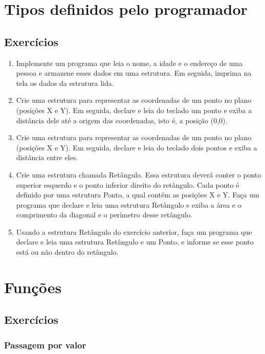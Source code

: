 \documentclass[a4paper,12pt]{article}
\begin{document}
\pagebreak
\section{Tipos definidos pelo programador}

\subsection{Exercícios}

\begin{enumerate}
  \item Implemente um programa que leia o nome, a idade e o endereço de uma pessoa e armazene esses dados em uma estrutura. Em seguida, imprima na tela os dados da estrutura lida.
  \item Crie uma estrutura para representar as coordenadas de um ponto no plano (posições X e Y). Em seguida, declare e leia do teclado um ponto e exiba a distância dele até a origem das coordenadas, isto é, a posição (0,0).
  \item Crie uma estrutura para representar as coordenadas de um ponto no plano (posições X e Y). Em seguida, declare e leia do teclado dois pontos e exiba a distância entre eles.
  \item Crie uma estrutura chamada Retângulo. Essa estrutura deverá conter o ponto superior esquerdo e o ponto inferior direito do retângulo. Cada ponto é definido por uma estrutura Ponto, a qual contém as posições X e Y. Faça um programa que declare e leia uma estrutura Retângulo e exiba a área e o comprimento da diagonal e o perímetro desse retângulo.
  \item Usando a estrutura Retângulo do exercício anterior, faça um programa que declare e leia uma estrutura Retângulo e um Ponto, e informe se esse ponto está ou não dentro do retângulo.
\end{enumerate}

\pagebreak
\section{Funções}

\subsection{Exercícios}

\subsubsection{Passagem por valor}
\end{document}
